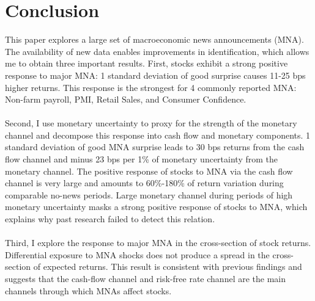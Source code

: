 \documentclass[12pt]{article}
\begin{document}
\section{Conclusion} \label{sec:Model}

This paper explores a large set of macroeconomic news announcements (MNA). The availability of new data enables improvements in identification, which allows me to obtain three important results. First, stocks exhibit a strong positive response to major MNA: 1 standard deviation of good surprise causes 11-25 bps higher returns. This response is the strongest for 4 commonly reported MNA: Non-farm payroll, PMI, Retail Sales, and Consumer Confidence. 
\paragraph{}
Second, I use monetary uncertainty to proxy for the strength of the monetary channel and decompose this response into cash flow and monetary components. 1 standard deviation of good MNA surprise leads to 30 bps returns from the cash flow channel and minus 23 bps per 1\% of monetary uncertainty from the monetary channel. The positive response of stocks to MNA via the cash flow channel is very large and amounts to 60\%-180\% of return variation during comparable no-news periods. Large monetary channel during periods of high monetary uncertainty masks a strong positive response of stocks to MNA, which explains why past research failed to detect this relation.
\paragraph{}
Third, I explore the response to major MNA in the cross-section of stock returns. Differential exposure to MNA shocks does not produce a spread in the cross-section of expected returns. This result is consistent with previous findings and suggests that the cash-flow channel and risk-free rate channel are the main channels through which MNAs affect stocks.



\pagebreak
\end{document}
